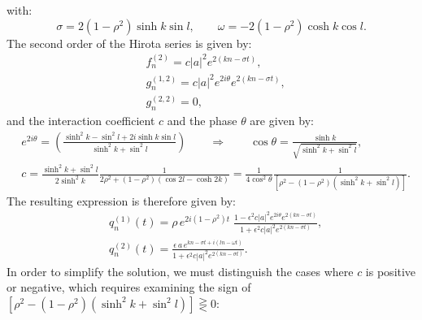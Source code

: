 \documentclass{article}
\begin{document}
with:
\begin{equation}
\sigma=2(1-\rho^2)\sinh k\sin l, \qquad \omega=-2(1-\rho^2)\cosh k\cos l.
\end{equation}
The second order of the Hirota series is given by:
\begin{equation}
    \begin{split}
   &   f^{(2)}_n= c |a|^2  e^{2(k n-\sigma t)}, \\
    &  g^{(1,2)}_n=c |a|^2 e^{2i\theta} e^{2(k n-\sigma t)}, \\
    &g^{(2,2)}_n=0,  
    \end{split}
\end{equation}
and the interaction coefficient $c$ and the phase $\theta$ are given by:
\begin{equation}
\begin{split}
  &  e^{2i\theta}=\left(\frac{\sinh^2k-\sin^2l+2i\sinh k\sin l}{\sinh^2k+\sin^2l}\right)\qquad \Rightarrow \qquad \cos\theta=\frac{\sinh k}{\sqrt{\sinh^2 k+\sin^2 l}},\\[2mm]
   &c=\frac{\sinh^2k+\sin^2l}{2\sinh^2k}\frac{1}{2\rho^2+(1-\rho^2)(\cos 2l-\cosh 2k)}=\frac{1}{4\cos^2\theta}\frac{1}{\left[\rho^2-(1-\rho^2)(\sinh^2k+\sin^2l)\right]}.
    \end{split}
\end{equation}
The resulting expression is therefore given by:
\begin{equation}
\begin{split}
 &   q^{(1)}_n(t)=\rho\,e^{2i(1-\rho^2) t}\;\frac{1-\epsilon^2c |a|^2e^{2i\theta} e^{2(k n-\sigma t)} }{1+\epsilon^2 c |a|^2  e^{2(k n-\sigma t)}},\\
 &   q^{(2)}_n(t)=\frac{\epsilon \,a\, e^{k n-\sigma t+i(l n-\omega t)}}{1+\epsilon^2 c |a|^2  e^{2(k n-\sigma t)} }.
    \end{split}
\end{equation}
In order to simplify the solution, we must distinguish the cases where $c$ is positive or negative, which requires examining the sign of $\left[\rho^2-(1-\rho^2)(\sinh^2k+\sin^2l)\right]\gtreqless 0$:
\end{document}

